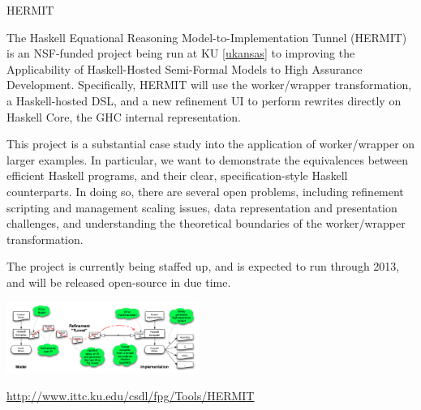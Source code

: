 \begin{hcarentry}{HERMIT}
\label{HERMIT}
\makeheader

The Haskell Equational Reasoning Model-to-Implementation Tunnel
(HERMIT) is an NSF-funded project being run at KU \cref{ukansas} to improving the
Applicability of Haskell-Hosted Semi-Formal Models to High Assurance
Development. Specifically, HERMIT will use the worker/wrapper
transformation, a Haskell-hosted DSL, and a new refinement UI to
perform rewrites directly on Haskell Core, the GHC internal
representation.

This project is a substantial case study into the application of
worker/wrapper on larger examples. In particular, we want to
demonstrate the equivalences between efficient Haskell programs, and
their clear, specification-style Haskell counterparts. In doing so,
there are several open problems, including refinement scripting and
management scaling issues, data representation and presentation
challenges, and understanding the theoretical boundaries of the
worker/wrapper transformation.

The project is currently being staffed up, and is
expected to run through 2013, and will be released
open-source in due time.

\begin{center}
\includegraphics[width=0.47\textwidth]{html/HERMIT-tunnel.png}
\end{center}

\FurtherReading
  \url{http://www.ittc.ku.edu/csdl/fpg/Tools/HERMIT}
\end{hcarentry}
